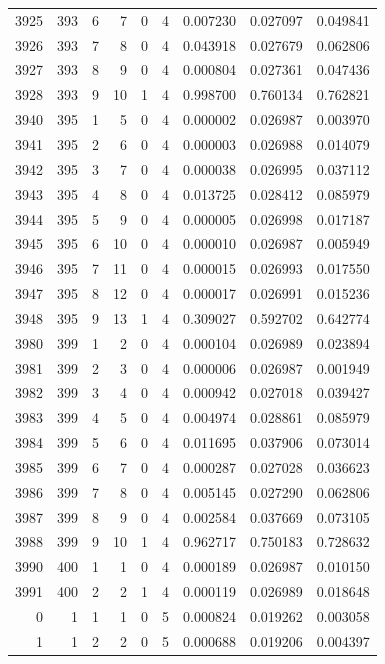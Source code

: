 \begin{longtable}{rrrrrrrrr}
3925 & 393 & 6 & 7 & 0 & 4 & 0.007230 & 0.027097 & 0.049841 \\
3926 & 393 & 7 & 8 & 0 & 4 & 0.043918 & 0.027679 & 0.062806 \\
3927 & 393 & 8 & 9 & 0 & 4 & 0.000804 & 0.027361 & 0.047436 \\
3928 & 393 & 9 & 10 & 1 & 4 & 0.998700 & 0.760134 & 0.762821 \\
3940 & 395 & 1 & 5 & 0 & 4 & 0.000002 & 0.026987 & 0.003970 \\
3941 & 395 & 2 & 6 & 0 & 4 & 0.000003 & 0.026988 & 0.014079 \\
3942 & 395 & 3 & 7 & 0 & 4 & 0.000038 & 0.026995 & 0.037112 \\
3943 & 395 & 4 & 8 & 0 & 4 & 0.013725 & 0.028412 & 0.085979 \\
3944 & 395 & 5 & 9 & 0 & 4 & 0.000005 & 0.026998 & 0.017187 \\
3945 & 395 & 6 & 10 & 0 & 4 & 0.000010 & 0.026987 & 0.005949 \\
3946 & 395 & 7 & 11 & 0 & 4 & 0.000015 & 0.026993 & 0.017550 \\
3947 & 395 & 8 & 12 & 0 & 4 & 0.000017 & 0.026991 & 0.015236 \\
3948 & 395 & 9 & 13 & 1 & 4 & 0.309027 & 0.592702 & 0.642774 \\
3980 & 399 & 1 & 2 & 0 & 4 & 0.000104 & 0.026989 & 0.023894 \\
3981 & 399 & 2 & 3 & 0 & 4 & 0.000006 & 0.026987 & 0.001949 \\
3982 & 399 & 3 & 4 & 0 & 4 & 0.000942 & 0.027018 & 0.039427 \\
3983 & 399 & 4 & 5 & 0 & 4 & 0.004974 & 0.028861 & 0.085979 \\
3984 & 399 & 5 & 6 & 0 & 4 & 0.011695 & 0.037906 & 0.073014 \\
3985 & 399 & 6 & 7 & 0 & 4 & 0.000287 & 0.027028 & 0.036623 \\
3986 & 399 & 7 & 8 & 0 & 4 & 0.005145 & 0.027290 & 0.062806 \\
3987 & 399 & 8 & 9 & 0 & 4 & 0.002584 & 0.037669 & 0.073105 \\
3988 & 399 & 9 & 10 & 1 & 4 & 0.962717 & 0.750183 & 0.728632 \\
3990 & 400 & 1 & 1 & 0 & 4 & 0.000189 & 0.026987 & 0.010150 \\
3991 & 400 & 2 & 2 & 1 & 4 & 0.000119 & 0.026989 & 0.018648 \\
0 & 1 & 1 & 1 & 0 & 5 & 0.000824 & 0.019262 & 0.003058 \\
1 & 1 & 2 & 2 & 0 & 5 & 0.000688 & 0.019206 & 0.004397 \\

\end{longtable}
